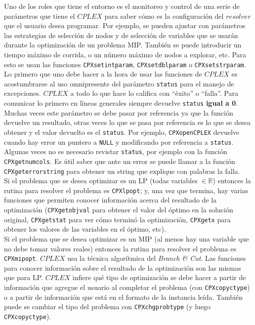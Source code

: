 Uno de los roles que tiene el entorno es el monitoreo y control de una serie de parámetros que tiene el $CPLEX$ para saber cómo es la configuración del $resolver$ que el usuario desea programar. Por ejemplo, se pueden ajustar con parámetros las estrategias de selección de nodos y de selección de variables que se usarán durante la optimización de un problema MIP. También se puede introducir un tiempo máximo de corrida, o un número máximo de nodos a explorar, etc. Para esto se usan las funciones \verb_CPXsetintparam_, \verb_CPXsetdblparam_ o \verb_CPXsetstrparam_.\\

Lo primero que uno debe hacer a la hora de usar las funciones de $CPLEX$ es acostumbrarse al uso omnipresente del parámetro \verb_status_ para el manejo de excepciones. $CPLEX$ a todo lo que hace lo califica con ``éxito'' o ``falla''. Para comunicar lo primero en líneas generales siempre devuelve \verb_status_ \textbf{igual a 0}. Muchas veces este parámetro se debe pasar por referencia ya que la función devuelve un resultado, otras veces lo que se pasa por referencia es lo que se desea obtener y el valor devuelto es el \verb_status_. Por ejemplo, \verb_CPXopenCPLEX_ devuelve cuando hay error un puntero a \verb_NULL_ y modificando por referencia a \verb_status_. Algunas veces no es necesario revistar \verb_status_, por ejemplo con la función \verb_CPXgetnumcols_. Es útil saber que ante un error se puede llamar a la función \verb_CPXgeterrorstring_ para obtener un string que explique con palabras la falla.\\

Si el problema que se desea optimizar es un LP (todas variables $\in\mathbb{R}$) entonces la rutina para resolver el problema es \verb_CPXlpopt_; y, una vez que termina, hay varias funciones que permiten conocer información acerca del resultado de la optimización (\verb_CPXgetobjval_ para obtener el valor del óptimo en la solución original, \verb_CPXgetstat_ para ver cómo terminó la optimización, \verb_CPXgetx_ para obtener los valores de las variables en el óptimo, etc).\\

Si el problema que se desea optimizar es un MIP (al menos hay una variable que no debe tomar valores reales) entonces la rutina para resolver el problema es \verb_CPXmipopt_. $CPLEX$ usa la técnica algorítmica del \emph{Branch \& Cut}. Las funciones para conocer información sobre el resultado de la optimización son las mismas que para LP. $CPLEX$ infiere qué tipo de optimización se debe hacer a partir de información que agregue el usuario al completar el problema (con \verb_CPXcopyctype_) o a partir de información que está en el formato de la instancia leída. También puede se cambiar el tipo del problema con \verb_CPXchgprobtype_ (y luego \verb_CPXcopyctype_).\\

